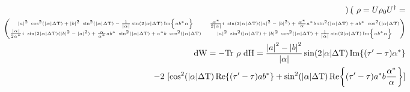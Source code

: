 \begin{align*}
\begin{pmatrix}
	\end{pmatrix}, \ \rho = U \rho_0 U^\dagger = \\
	\tiny
	\begin{pmatrix}
	\abs{a}^2 \ \cos^2(\abs{\alpha} \Delta \mathrm{T}) + \abs{b}^2 \ \sin^2(\abs{\alpha} \Delta \mathrm{T}) - \frac{1}{\abs{\alpha}} \sin(2 \abs{\alpha} \Delta \mathrm{T}) \Im{a b^* \alpha} & 
	\frac{\alpha^*}{2 \abs{\alpha}} i \ \sin(2 \abs{\alpha} \Delta \mathrm{T}) (\abs{a}^2 - \abs{b}^2) + \frac{\alpha^*}{\alpha} a^* b \sin^2(\abs{\alpha} \Delta \mathrm{T}) + a b^* \ \cos^2(\abs{\alpha} \Delta \mathrm{T}) \\
	\frac{\abs{\alpha}}{2 \alpha^*} i \ \sin(2 \abs{\alpha} \Delta \mathrm{T}) (\abs{b}^2 - \abs{a}^2) + \frac{\alpha}{\alpha^*} a b^* \ \sin^2(\abs{\alpha} \Delta \mathrm{T}) + a^* b \ \cos^2(\abs{\alpha} \Delta \mathrm{T}) & 
	\abs{a}^2 \ \sin^2(\abs{\alpha} \Delta \mathrm{T}) + \abs{b}^2 \ \cos^2(\abs{\alpha} \Delta \mathrm{T}) + \frac{1}{\abs{\alpha}} \sin(2 \abs{\alpha} \Delta \mathrm{T}) \Im{a b^* \alpha}
	\end{pmatrix} \\
	\mathrm{dW} = - \mathrm{Tr} \ \rho \ \mathrm{dH} = \frac{\abs{a}^2 - \abs{b}^2}{\abs{\alpha}} \sin(2 \abs{\alpha} \Delta \mathrm{T}) \Im{(\tau' - \tau) \alpha^*} \\
	- 2 \ [\cos^2(\abs{\alpha} \Delta \mathrm{T}) \Re{(\tau' - \tau) a b^*} 
	+ \sin^2(\abs{\alpha} \Delta \mathrm{T}) \Re{(\tau' - \tau)a^* b \frac{\alpha^*}{\alpha}} ] \\
\end{align*}